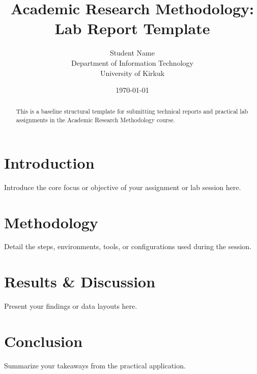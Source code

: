 \documentclass[12pt,a4paper]{article}
\title{Academic Research Methodology: Lab Report Template}
\author{Student Name \\ Department of Information Technology \\ University of Kirkuk}
\date{\today}
\begin{document}
\maketitle

\begin{abstract}
This is a baseline structural template for submitting technical reports and practical lab assignments in the Academic Research Methodology course.
\end{abstract}

\section{Introduction}
Introduce the core focus or objective of your assignment or lab session here.

\section{Methodology}
Detail the steps, environments, tools, or configurations used during the session.

\section{Results \& Discussion}
Present your findings or data layouts here.

\section{Conclusion}
Summarize your takeaways from the practical application.
\end{document}
